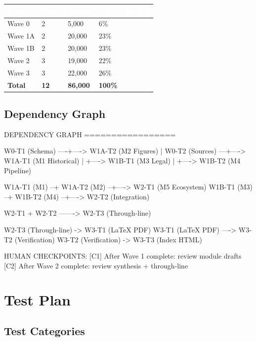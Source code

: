\documentclass[11pt,letterpaper]{article}
\newcommand{\tableheader}[1]{\textbf{\sffamily\textcolor{white}{#1}}}
\begin{document}
\begin{center}
\begin{tabularx}{\textwidth}{L{3cm}C{2cm}C{2cm}C{3cm}}
\toprule
{}
\tableheader{Wave} & \tableheader{Tasks} & \tableheader{Tokens} & \tableheader{Pct. of Budget} \\
\midrule
Wave 0 & 2 & 5,000 & 6\% \\
Wave 1A & 2 & 20,000 & 23\% \\
Wave 1B & 2 & 20,000 & 23\% \\
Wave 2 & 3 & 19,000 & 22\% \\
Wave 3 & 3 & 22,000 & 26\% \\
\midrule
\textbf{Total} & \textbf{12} & \textbf{86,000} & \textbf{100\%} \\
\bottomrule
\end{tabularx}
\end{center}

\subsection{Dependency Graph}

\begin{asciibox}
DEPENDENCY GRAPH
=================

W0-T1 (Schema) ----+----> W1A-T2 (M2 Figures)
                   |
W0-T2 (Sources) ---+----> W1A-T1 (M1 Historical)
                   |
                   +----> W1B-T1 (M3 Legal)
                   |
                   +----> W1B-T2 (M4 Pipeline)

W1A-T1 (M1) --+
W1A-T2 (M2) --+----> W2-T1 (M5 Ecosystem)
W1B-T1 (M3) --+
W1B-T2 (M4) --+----> W2-T2 (Integration)

W2-T1 + W2-T2 -------> W2-T3 (Through-line)

W2-T3 (Through-line) -> W3-T1 (LaTeX PDF)
W3-T1 (LaTeX PDF) ----> W3-T2 (Verification)
W3-T2 (Verification) -> W3-T3 (Index HTML)

HUMAN CHECKPOINTS:
  [C1] After Wave 1 complete: review module drafts
  [C2] After Wave 2 complete: review synthesis + through-line
\end{asciibox}

\section{Test Plan}

\subsection{Test Categories}
\end{document}
